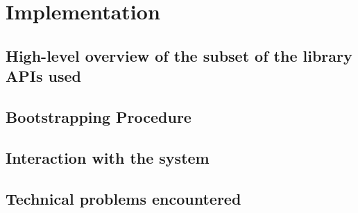 \chapter{Implementation}

\section{High-level overview of the subset of the library APIs used}

\section{Bootstrapping Procedure}

\section{Interaction with the system}

\section{Technical problems encountered}